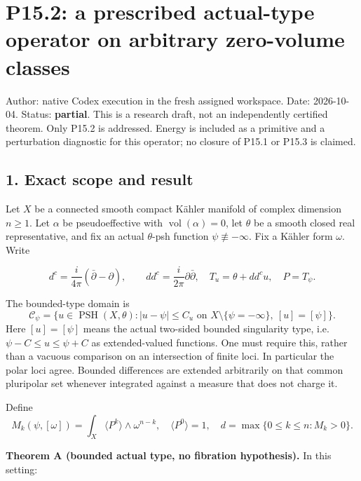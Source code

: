 \documentclass[
  10pt,
]{article}
\author{}
\date{}
\begin{document}
\section{P15.2: a prescribed actual-type operator on arbitrary
zero-volume
classes}\label{p15.2-a-prescribed-actual-type-operator-on-arbitrary-zero-volume-classes}

Author: native Codex execution in the fresh assigned workspace. Date:
2026-10-04. Status: \textbf{partial}. This is a research draft, not an
independently certified theorem. Only P15.2 is addressed. Energy is
included as a primitive and a perturbation diagnostic for this operator;
no closure of P15.1 or P15.3 is claimed.

\subsection{1. Exact scope and result}\label{exact-scope-and-result}

Let \(X\) be a connected smooth compact Kähler manifold of complex
dimension \(n\geq1\). Let \(\alpha\) be pseudoeffective with
\(\operatorname{vol}(\alpha)=0\), let \(\theta\) be a smooth closed real
representative, and fix an actual \(\theta\)-psh function
\(\psi\not\equiv-\infty\). Fix a Kähler form \(\omega\). Write

\[
d^c=\frac{i}{4\pi}(\bar\partial-\partial),\qquad dd^c=\frac{i}{2\pi}\partial\bar\partial,
\quad T_u=\theta+dd^cu,\quad P=T_\psi.
\]

The bounded-type domain is \[
\mathcal C_\psi=\{u\in\operatorname{PSH}(X,\theta): |u-\psi|\leq C_u\text{ on }X\setminus\{\psi=-\infty\},\ [u]=[\psi]\}.
\] Here \([u]=[\psi]\) means the actual two-sided bounded singularity
type, i.e.~\(\psi-C\leq u\leq\psi+C\) as extended-valued functions. One
must require this, rather than a vacuous comparison on an intersection
of finite loci. In particular the polar loci agree. Bounded differences
are extended arbitrarily on that common pluripolar set whenever
integrated against a measure that does not charge it.

Define \[
M_k(\psi,[\omega])=\int_X\langle P^k\rangle\wedge\omega^{n-k},\quad
\langle P^0\rangle=1,\quad
d=\max\{0\leq k\leq n:M_k>0\}.
\]

\textbf{Theorem A (bounded actual type, no fibration hypothesis).} In
this setting:
\end{document}
